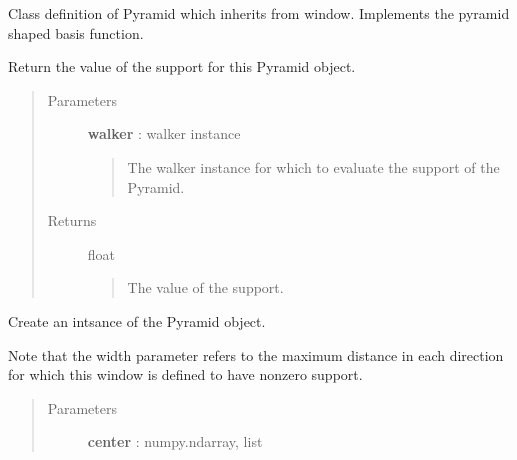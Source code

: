 \documentclass[letterpaper,10pt,english]{sphinxmanual}
\begin{document}
\begin{fulllineitems}
\label{neus/neus.doc:neus.pyramid.Pyramid}
Class definition of Pyramid which inherits from window. Implements the pyramid shaped basis function.

\begin{fulllineitems}
\label{neus/neus.doc:neus.pyramid.Pyramid.__call__}
Return the value of the support for this Pyramid object.
\begin{quote}\begin{description}
\item[{Parameters}] \leavevmode
\textbf{walker} : walker instance
\begin{quote}

The walker instance for which to evaluate the support of the Pyramid.
\end{quote}

\item[{Returns}] \leavevmode
float
\begin{quote}

The value of the support.
\end{quote}

\end{description}\end{quote}

\end{fulllineitems}


\begin{fulllineitems}
\label{neus/neus.doc:neus.pyramid.Pyramid.__init__}
Create an intsance of the Pyramid object.

Note that the width parameter refers to the maximum distance in each direction for which this window is defined to have nonzero support.
\begin{quote}\begin{description}
\item[{Parameters}] \leavevmode
\textbf{center} : numpy.ndarray, list
\begin{quote}


\end{quote}
\end{description}
\end{quote}
\end{fulllineitems}
\end{fulllineitems}
\end{document}
